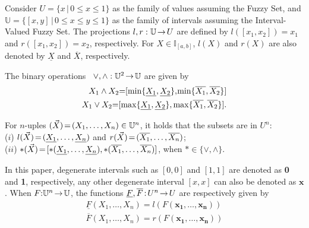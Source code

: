 \documentclass[conference]{IEEEtran}
\theoremstyle{plain}
\theoremstyle{remark}
\theoremstyle{definition}
\theoremstyle{proposition}
\newcommand{\lra}{\hspace{-0.05cm}\rightarrow\hspace{-0.05cm}}
\newcommand{\UU}{\mathbb{U} }
\begin{document}
Consider $U = \{x \, | \, 0\leq x\leq 1\}$ as the family of values assuming the Fuzzy Set, and $\UU = \{[x,y] \, | \, 0\leq x\leq y\leq 1\}$ as the family of intervals assuming the Interval-Valued Fuzzy Set. The projections $l,r:\UU\hspace{-0.05cm}\rightarrow\hspace{-0.05cm} U$ are defined by $l([x_1,x_2])=x_1$ and $r([x_1,x_2])=x_2$,
respectively. For $X\in \mathbb{I}_{[a,b]}$,  $l(X)$ and $r(X)$ are also denoted by $\underline{X}$ and $\overline{X}$,
respectively.  

The binary operations \mbox{ $\vee, \wedge: {\UU}^2 \hspace{-0.05cm}\rightarrow\hspace{-0.05cm} \UU$} are given by
\begin{eqnarray}
X_1 \wedge X_2 \hspace{-0.1cm}=\hspace{-0.1cm} [\min\{\underline{X_1},\underline{X_2}\},\hspace{-0.05cm} \min\{\overline{X_1},\overline{X_2}\}] \\
X_1\vee X_2 \hspace{-0.1cm}=\hspace{-0.1cm} [\max\{\underline{X_1},\underline{X_2}\}, \max\{\overline{X_1},\overline{X_2}\}].
\end{eqnarray}

For $n$-uples $(\vec{X})\hspace{-0.05cm}=\hspace{-0.05cm}(X_1, \ldots, X_n) \in {\UU}^n$, it holds that the subsets are in $U^n$: \\
($i$) $l(\vec{X})\hspace{-0.05cm}=\hspace{-0.05cm}(\underline{X_1}, \ldots, \underline{X_n})$ and $r(\vec{X})\hspace{-0.05cm}=\hspace{-0.05cm}(\overline{X_1}, \ldots, \overline{X_n})$; \\
($ii$) $\ast(\vec{X})\hspace{-0.05cm}=\hspace{-0.05cm}[\ast(\underline{X_1}, \ldots, \underline{X_n}), \ast(\overline{X_1}, \ldots, \overline{X_n})]$, when $\ast \in \{\vee, \wedge\}$.

In this paper, degenerate intervals such as $[0,0]$ and $[1,1]$ are denoted as \textbf{0} and \textbf{1}, respectively, any other degenerate interval $[x,x]$ can also be denoted as $\boldsymbol{x}$. When $F\hspace{-0.1cm}:\hspace{-0.1cm}{\UU}^n\lra \UU$, the functions $\underline{F},\overline{F}\hspace{-0.05cm}:\hspace{-0.05cm}U^n\lra U$ are respectively given by \begin{eqnarray}
\underline{F}(X_1,\ldots,X_n) =l(F(\boldsymbol{x_1},\ldots,\boldsymbol{x_n}))\\
\overline{F}(X_1,\ldots,X_n)=r(F(\boldsymbol{x_1},\ldots,\boldsymbol{x_n}))
\end{eqnarray}
\end{document}
